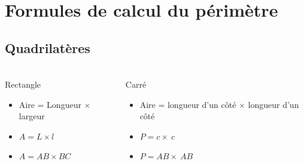 \documentclass[xcolor=table]{beamer}
\begin{document}
\section{Formules de calcul du périmètre}

\subsection{Quadrilatères}

\begin{frame}
	\frametitle{}  
	\framesubtitle{}	
	
		
	\begin{columns}[onlytextwidth]
		\begin{column}{0.48\textwidth}
			\begin{alertblock}{Rectangle} %
				\begin{itemize}
					\item Aire = Longueur $\times$ largeur 
					\item $A = L \times l$
					\item $A = AB \times BC$
				\end{itemize}
				
			\end{alertblock}
		\end{column}
		\begin{column}{0.48\textwidth}
			\begin{alertblock}{Carré} %
				\begin{itemize}
					\item Aire = longueur d'un côté $\times$ longueur d'un côté
					\item $P = c \times\ c $
					\item $P = AB \times\ AB $
				\end{itemize}
				
			\end{alertblock}
		\end{column}
	\end{columns}
\end{frame}
\end{document}
